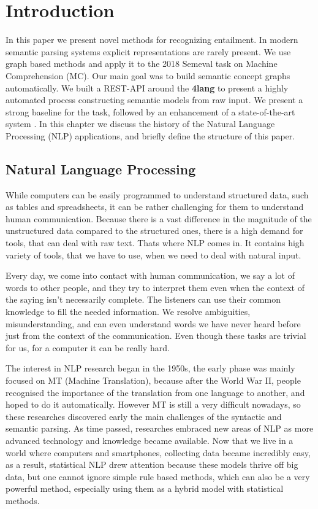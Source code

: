\chapter{Introduction}
\label{chap:Introdu}
In this paper we present novel methods for recognizing entailment. In modern semantic parsing systems explicit representations are rarely present. We use graph based methods and apply it to the 2018 Semeval task on Machine Comprehension (MC). Our main goal was to build semantic concept graphs automatically. We built a REST-API around the \textbf{4lang}\cite{Recski:2016} to present a highly automated process constructing semantic models from raw input. We present a strong baseline for the task, followed by an enhancement of a state-of-the-art system \cite{Wang:2018}. In this chapter we discuss the history of the Natural Language Processing (NLP) applications, and briefly define the structure of this paper.
\section{Natural Language Processing}
While computers can be easily programmed to understand structured data, such as tables and spreadsheets, it can be rather challenging for them
to understand human communication. Because there is a vast difference in the magnitude of the unstructured data compared to the structured ones, there is a high demand
for tools, that can deal with raw text. Thats where NLP comes in. It contains high variety of tools, that we have to use, when we need to deal with natural input.

Every day, we come into contact with human communication, we say a lot of words to other people, and they try to interpret them even when the context of the saying 
isn't necessarily complete. The listeners can use their common knowledge to fill the needed information. We resolve ambiguities, misunderstanding, and can even understand words 
we have never heard before just from the context of the communication.
Even though these tasks are trivial for us, for a computer it can be really hard.

The interest in NLP research began in the 1950s, the early phase was mainly focused on MT (Machine Translation), because after the World War II, people
recognised the importance of the translation from one language to another, and hoped to do it automatically.
However MT is still a very difficult nowadays, so these researches discovered early the main challenges of the syntactic and semantic parsing.
As time passed, researches embraced new areas of NLP as more advanced technology and knowledge became available. Now that we live in a world where
computers and smartphones, collecting data became incredibly easy, as a result, statistical NLP drew attention because these models thrive off big data, but one cannot ignore 
simple rule based methods, which can also be a very powerful method, especially using them as a hybrid model with statistical methods.

